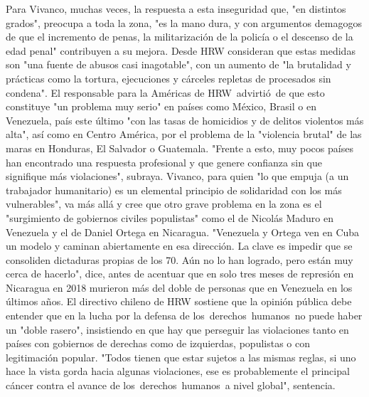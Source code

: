 \documentclass{article}%
\begin{document}
\newline%
%
Para Vivanco, muchas veces, la respuesta a esta inseguridad que, "en distintos grados", preocupa a toda la zona, "es la mano dura, y con argumentos demagogos de que el incremento de penas, la militarización de la policía o el descenso de la edad penal" contribuyen a su mejora.%
\newline%
%
Desde HRW consideran que estas medidas son "una fuente de abusos casi inagotable", con un aumento de "la brutalidad y prácticas como la tortura, ejecuciones y cárceles repletas de procesados sin condena".%
\newline%
%
El responsable para la Américas de HRW~advirtió~de que esto constituye "un problema muy serio" en países como México, Brasil o en Venezuela, país este último "con las tasas de homicidios y de delitos violentos más alta", así como en Centro América, por el problema de la "violencia brutal" de las maras en Honduras, El Salvador o Guatemala.%
\newline%
%
"Frente a esto, muy pocos países han encontrado una respuesta profesional y que genere confianza sin que signifique más violaciones", subraya.%
\newline%
%
Vivanco, para quien "lo que empuja (a un trabajador humanitario) es un elemental principio de solidaridad con los más vulnerables", va más allá y cree que otro grave problema en la zona es el "surgimiento de gobiernos civiles populistas" como el de Nicolás Maduro en Venezuela y el de Daniel Ortega en Nicaragua.%
\newline%
%
"Venezuela y Ortega ven en Cuba un modelo y caminan abiertamente en esa dirección. La clave es impedir que se consoliden dictaduras propias de los 70. Aún no lo han logrado, pero están muy cerca de hacerlo", dice, antes de acentuar que en solo tres meses de represión en Nicaragua en 2018 murieron más del doble de personas que en Venezuela en los últimos años.%
\newline%
%
El directivo chileno de HRW sostiene que la opinión pública debe entender que en la lucha por la defensa de los~derechos~humanos~no puede haber un "doble rasero", insistiendo en que hay que perseguir las violaciones tanto en países con gobiernos de derechas como de izquierdas, populistas o con legitimación popular.%
\newline%
%
"Todos tienen que estar sujetos a las mismas reglas, si uno hace la vista gorda hacia algunas violaciones, ese es probablemente el principal cáncer contra el avance de los~derechos~humanos~a nivel global", sentencia.%
\end{document}
